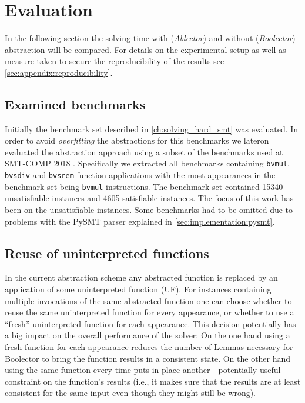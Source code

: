 \chapter{Evaluation}
\label{ch:evaluation}
In the following section the solving time with (\textit{Ablector}) and without (\textit{Boolector}) abstraction will be compared.
For details on the experimental setup as well as measure taken to secure the reproducibility of the results see \ref{sec:appendix:reproducibility}.
\section{Examined benchmarks}
Initially the benchmark set described in \ref{ch:solving_hard_smt} was evaluated.
In order to avoid \textit{overfitting} the abstractions for this benchmarks we lateron
evaluated the abstraction approach using a subset of the benchmarks used at SMT-COMP 2018 \cite{SMTCOMP18}.
Specifically we extracted all benchmarks containing \texttt{bvmul}, \texttt{bvsdiv} and \texttt{bvsrem} function applications with the most appearances in the benchmark set being \texttt{bvmul} instructions.
The benchmark set contained 15340 unsatisfiable instances and 4605 satisfiable instances. The focus of this work has been on the unsatisfiable instances.
Some benchmarks had to be omitted due to problems with the PySMT parser explained in \ref{sec:implementation:pysmt}.

\section{Reuse of uninterpreted functions}
In the current abstraction scheme any abstracted function is replaced by an application of some uninterpreted function (UF).
For instances containing multiple invocations of the same abstracted function one can choose whether to reuse the same uninterpreted function for every appearance,
or whether to use a \enquote{fresh} uninterpreted function for each appearance.
This decision potentially has a big impact on the overall performance of the solver:
On the one hand using a fresh function for each appearance reduces the number of Lemmas necessary for Boolector to bring the function results in a consistent state.
On the other hand using the same function every time puts in place another - potentially useful - constraint on the function's results
(i.e., it makes sure that the results are at least consistent for the same input even though they might still be wrong).


